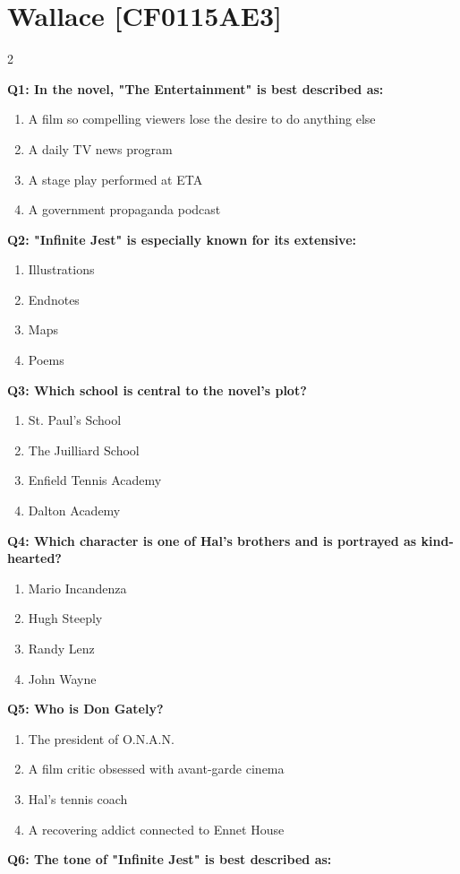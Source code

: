 \documentclass[10pt]{article}
\begin{document}
\section*{Wallace \footnotesize [CF0115AE3]}
\begin{multicols}{2}

\textbf{Q1: In the novel, "The Entertainment" is best described as:}

\begin{enumerate}[label=\arabic*.]
\item A film so compelling viewers lose the desire to do anything else
\item A daily TV news program
\item A stage play performed at ETA
\item A government propaganda podcast
\end{enumerate}
\textbf{Q2: "Infinite Jest" is especially known for its extensive:}

\begin{enumerate}[label=\arabic*.]
\item Illustrations
\item Endnotes
\item Maps
\item Poems
\end{enumerate}
\textbf{Q3: Which school is central to the novel's plot?}

\begin{enumerate}[label=\arabic*.]
\item St. Paul's School
\item The Juilliard School
\item Enfield Tennis Academy
\item Dalton Academy
\end{enumerate}
\textbf{Q4: Which character is one of Hal's brothers and is portrayed as kind-hearted?}

\begin{enumerate}[label=\arabic*.]
\item Mario Incandenza
\item Hugh Steeply
\item Randy Lenz
\item John Wayne
\end{enumerate}
\textbf{Q5: Who is Don Gately?}

\begin{enumerate}[label=\arabic*.]
\item The president of O.N.A.N.
\item A film critic obsessed with avant-garde cinema
\item Hal's tennis coach
\item A recovering addict connected to Ennet House
\end{enumerate}
\textbf{Q6: The tone of "Infinite Jest" is best described as:}


\end{multicols}
\end{document}
